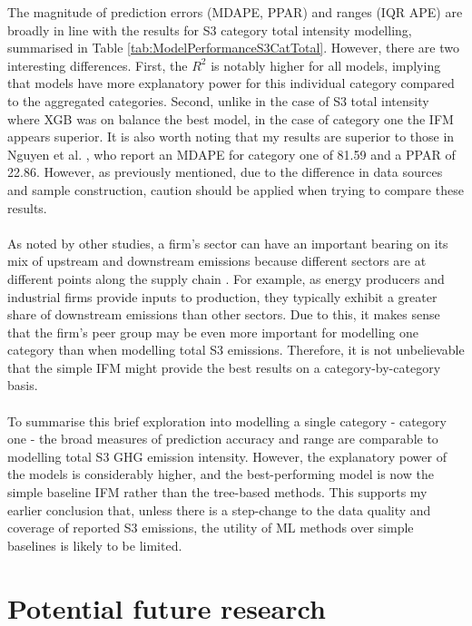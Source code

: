 \documentclass[12pt,twoside]{report}
\begin{document}
The magnitude of prediction errors (MDAPE, PPAR) and ranges (IQR APE) are broadly in line with the results for S3 category total intensity modelling, summarised in Table \ref{tab:ModelPerformanceS3CatTotal}. However, there are two interesting differences. First, the $R^{2}$ is notably higher for all models, implying that models have more explanatory power for this individual category compared to the aggregated categories. Second, unlike in the case of S3 total intensity where XGB was on balance the best model, in the case of category one the IFM appears superior. It is also worth noting that my results are superior to those in Nguyen et al. \cite{Nguyenetal2023}, who report an MDAPE for category one of 81.59 and a PPAR of 22.86. However, as previously mentioned, due to the difference in data sources and sample construction, caution should be applied when trying to compare these results.
\\\\
As noted by other studies, a firm's sector can have an important bearing on its mix of upstream and downstream emissions because different sectors are at different points along the supply chain \cite{ftserussell2024}. For example, as energy producers and industrial firms provide inputs to production, they typically exhibit a greater share of downstream emissions than other sectors. Due to this, it makes sense that the firm's peer group may be even more important for modelling one category than when modelling total S3 emissions. Therefore, it is not unbelievable that the simple IFM might provide the best results on a category-by-category basis. 
\\\\
To summarise this brief exploration into modelling a single category - category one - the broad measures of prediction accuracy and range are comparable to modelling total S3 GHG emission intensity. However, the explanatory power of the models is considerably higher, and the best-performing model is now the simple baseline IFM rather than the tree-based methods. This supports my earlier conclusion that, unless there is a step-change to the data quality and coverage of reported S3 emissions, the utility of ML methods over simple baselines is likely to be limited.

\chapter{Potential future research}\label{Chapter:FutureApplications}
\end{document}
